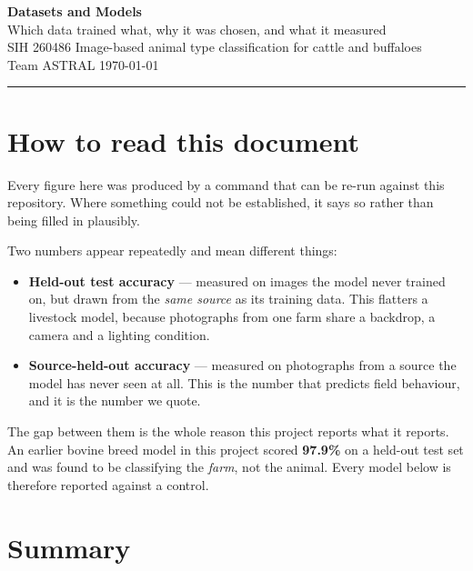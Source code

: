 \documentclass[11pt,a4paper]{article}
\newcommand{\good}[1]{{\color{measured}\textbf{#1}}}
\newcommand{\bad}[1]{{\color{invented}\textbf{#1}}}
\begin{document}
\begin{center}
{\LARGE\bfseries Datasets and Models}\\[0.35em]
{\large Which data trained what, why it was chosen, and what it measured}\\[0.9em]
{\color{soft}SIH 260486 \textbullet{} Image-based animal type classification for cattle and buffaloes\\
Team ASTRAL \textbullet{} \today}
\end{center}

\vspace{0.6em}
\hrule
\vspace{1.2em}

\section*{How to read this document}

Every figure here was produced by a command that can be re-run against this
repository. Where something could not be established, it says so rather than
being filled in plausibly.

Two numbers appear repeatedly and mean different things:

\begin{itemize}[leftmargin=1.4em,itemsep=0.2em]
  \item \textbf{Held-out test accuracy} --- measured on images the model never
        trained on, but drawn from the \emph{same source} as its training data.
        This flatters a livestock model, because photographs from one farm
        share a backdrop, a camera and a lighting condition.
  \item \good{Source-held-out accuracy} --- measured on photographs from a
        source the model has never seen at all. This is the number that
        predicts field behaviour, and it is the number we quote.
\end{itemize}

The gap between them is the whole reason this project reports what it reports.
An earlier bovine breed model in this project scored \bad{97.9\%} on a
held-out test set and was found to be classifying the \emph{farm}, not the
animal. Every model below is therefore reported against a control.

\section{Summary}
\end{document}
